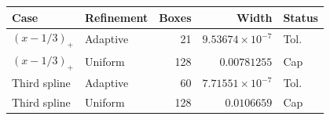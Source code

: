 \begin{tabular}{@{}llrrl@{}}
\toprule
Case & Refinement & Boxes & Width & Status \\
\midrule
$(x-1/3)_+$ & Adaptive & 21 & $9.53674\times10^{-7}$ & Tol. \\
$(x-1/3)_+$ & Uniform & 128 & $0.00781255$ & Cap \\
Third spline & Adaptive & 60 & $7.71551\times10^{-7}$ & Tol. \\
Third spline & Uniform & 128 & $0.0106659$ & Cap \\
\bottomrule
\end{tabular}
